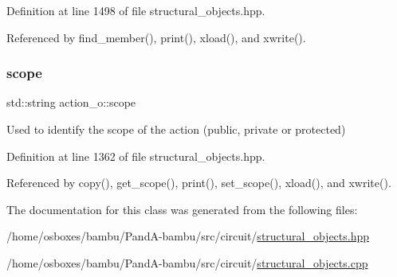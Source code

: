 Definition at line 1498 of file structural\+\_\+objects.\+hpp.



Referenced by find\+\_\+member(), print(), xload(), and xwrite().

\mbox{\label{classaction__o_a09ed880a45a186da31672a86a0b3d83d}} 
\subsubsection{\texorpdfstring{scope}{scope}}
{\footnotesize\ttfamily std\+::string action\+\_\+o\+::scope\hspace{0.3cm}{\ttfamily [private]}}



Used to identify the scope of the action (public, private or protected) 



Definition at line 1362 of file structural\+\_\+objects.\+hpp.



Referenced by copy(), get\+\_\+scope(), print(), set\+\_\+scope(), xload(), and xwrite().



The documentation for this class was generated from the following files\+:\begin{DoxyCompactItemize}
\item 
/home/osboxes/bambu/\+Pand\+A-\/bambu/src/circuit/\hyperlink{structural__objects_8hpp}{structural\+\_\+objects.\+hpp}\item 
/home/osboxes/bambu/\+Pand\+A-\/bambu/src/circuit/\hyperlink{structural__objects_8cpp}{structural\+\_\+objects.\+cpp}\end{DoxyCompactItemize}
